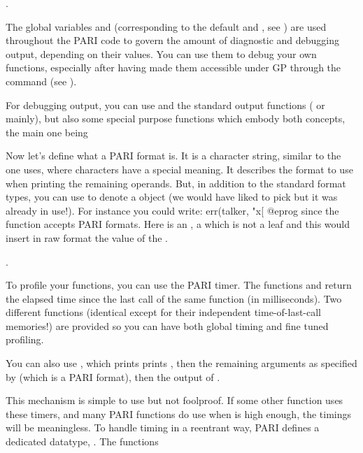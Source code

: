 .\label{se:dbg_output}

\noindent
The global variables  and  (corresponding
to the default  and , see )
are used throughout the PARI code to govern the amount of diagnostic and
debugging output, depending on their values. You can use them to debug your
own functions, especially after having made them accessible under GP through
the command  (see ).

For debugging output, you can use  and the standard output
functions ( or  mainly), but also some special purpose
functions which embody both concepts, the main one being


\noindent
Now let's define what a PARI format is. It is a character string, similar
to the one  uses, where \kbd{\%} characters have a special
meaning. It describes the format to use when printing the remaining operands.
But, in addition to the standard format types, you can use  to
denote a  object (we would have liked to pick  but it was
already in use!). For instance you could write:
\bprog
err(talker, "x[%
@eprog
\noindent since the  function accepts PARI formats. Here 
is an ,  a  which is not a leaf and this would
insert in raw format the value of the  .

.

\noindent
To profile your functions, you can use the PARI timer. The functions
 and  return the elapsed time since
the last call of the same function (in milliseconds). Two different
functions (identical except for their independent time-of-last-call
memories!) are provided so you can have both global timing and fine tuned
profiling.

You can also use , which prints
prints , then the remaining arguments as specified by
 (which is a PARI format), then the output of .

This mechanism is simple to use but not foolproof. If some other function
uses these timers, and many PARI functions do use  when
 is high enough, the timings will be meaningless. To handle
timing in a reentrant way, PARI defines a dedicated datatype,
. The functions 

